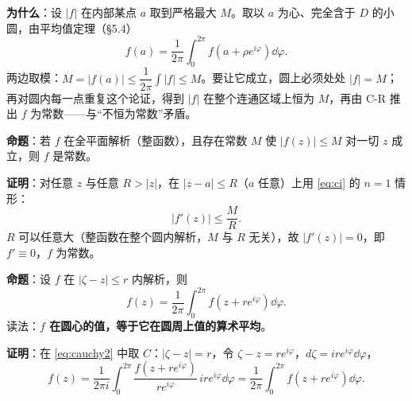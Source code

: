 \textbf{为什么}：设 $|f|$ 在内部某点 $a$ 取到严格最大 $M$。取以 $a$ 为心、完全含于 $D$ 的小圆，由平均值定理（§5.4）
\[ f(a)=\frac{1}{2\pi}\int_0^{2\pi}f(a+\rho e^{i\varphi})\dd\varphi . \]
两边取模：$M=|f(a)|\le\dfrac{1}{2\pi}\int|f|\le M$。要让它成立，圆上必须处处 $|f|=M$；再对圆内每一点重复这个论证，得到 $|f|$ 在整个连通区域上恒为 $M$，再由 C-R 推出 $f$ 为常数——与“不恒为常数”矛盾。



\textbf{命题}：若 $f$ 在全平面解析（整函数），且存在常数 $M$ 使 $|f(z)|\le M$ 对一切 $z$ 成立，则 $f$ 是常数。

\textbf{证明}：对任意 $z$ 与任意 $R>|z|$，在 $|z-a|\le R$（$a$ 任意）上用 \eqref{eq:ci} 的 $n=1$ 情形：
\[ |f'(z)|\le\frac{M}{R} . \]
$R$ 可以任意大（整函数在整个圆内解析，$M$ 与 $R$ 无关），故 $|f'(z)|=0$，即 $f'\equiv0$，$f$ 为常数。



\textbf{命题}：设 $f$ 在 $|\zeta-z|\le r$ 内解析，则
\begin{equation}\label{eq:mean}
f(z)=\frac{1}{2\pi}\int_0^{2\pi}f(z+re^{i\varphi})\dd\varphi .
\end{equation}
读法：\textbf{$f$ 在圆心的值，等于它在圆周上值的算术平均}。

\textbf{证明}：在 \eqref{eq:cauchy2} 中取 $C$：$|\zeta-z|=r$，令 $\zeta-z=re^{i\varphi}$，$d\zeta=ire^{i\varphi}\dd\varphi$，
\[ f(z)=\frac{1}{2\pi i}\int_0^{2\pi}\frac{f(z+re^{i\varphi})}{re^{i\varphi}}\,ire^{i\varphi}\dd\varphi
=\frac{1}{2\pi}\int_0^{2\pi}f(z+re^{i\varphi})\dd\varphi . \]

